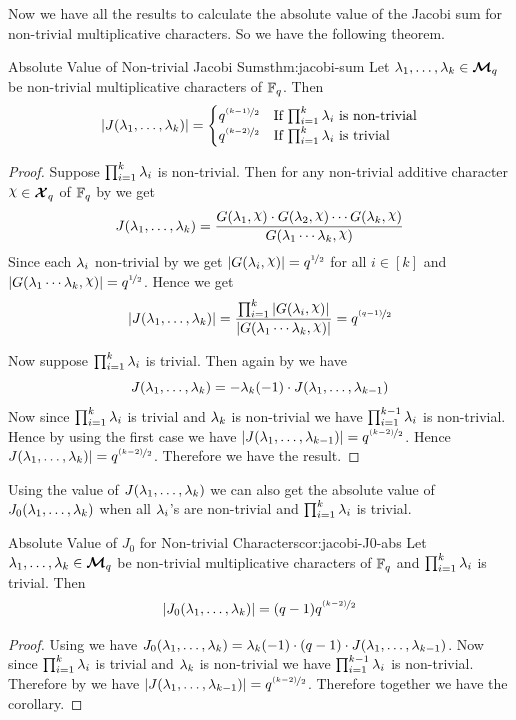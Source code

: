 Now we have all the results to calculate the absolute value of the Jacobi sum for non-trivial multiplicative characters. So we have the following theorem. 
\begin{Theorem}{Absolute Value of Non-trivial Jacobi Sums}{thm:jacobi-sum}
  Let $\lambda_1,\dots,\lambda_k\in\boldsymbol{\mathcal{M}}_q$ be non-trivial multiplicative characters of $\mathbb{F}_q$. Then $$|J(\lambda_1,\dots,\lambda_k)|=\begin{cases}
    q^{\nicefrac{(k-1)}{2}}& \text{If $\prod_{i=1}^k \lambda_i$ is non-trivial}\\ 
    q^{\nicefrac{(k-2)}{2}}& \text{If $\prod_{i=1}^k \lambda_i$ is trivial}
  \end{cases}$$
\end{Theorem}
\begin{proof}
  Suppose $\prod_{i=1}^k\lambda_i$ is non-trivial. Then for any non-trivial additive character $\chi\in\Xq$ of $\mathbb{F}_q$ by  we get $$J(\lm_1,\dots, \lm_k)=\frac{G(\lm_1,\chi)\cdot G(\lm_2,\chi)\cdots G(\lm_k,\chi)}{G(\lm_1\cdots \lm_k,\chi)}$$Since each $\lambda_i$ non-trivial by  we get $|G(\lm_i,\chi)|=q^{\nicefrac12}$ for all $i\in[k]$ and $|G(\lm_1\cdots\lm_k,\chi)|=q^{\nicefrac12}$. Hence we get $$|J(\lm_1,\dots,\lm_k)|=\frac{\prod_{i=1}^k|G(\lm_i,\chi)|}{|G(\lm_1\cdots\lm_k,\chi)|}=q^{\nicefrac{(q-1)}{2}}$$
  
  Now suppose $\prod_{i=1}^k\lambda_i$ is trivial. Then again by  we have $$J(\lambda_1,\dots, \lambda_k) = -\lambda_k(-1)\cdot J(\lambda_1,\dots, \lambda_{k-1})$$Now since $\prod_{i=1}^k\lambda_i$ is trivial and $\lambda_k$ is non-trivial we have $\prod_{i=1}^{k-1}\lambda_i$ is non-trivial. Hence by using the first case we have $|J(\lambda_1,\dots,\lambda_{k-1})|=q^{\nicefrac{(k-2)}{2}}$. Hence $J(\lambda_1,\dots, \lambda_k)|=q^{\nicefrac{(k-2)}{2}}$. Therefore we have the result. 
\end{proof}

Using the value of $J(\lambda_1,\dots,\lambda_k)$ we can also get the absolute value of $J_0(\lambda_1,\dots,\lambda_k)$ when all $\lambda_i$'s are non-trivial and $\prod_{i=1}^k\lambda_i$ is trivial. 
\begin{corolary}{Absolute Value of $J_0$ for Non-trivial Characters}{cor:jacobi-J0-abs}
  Let $\lambda_1,\dots,\lambda_k\in\boldsymbol{\mathcal{M}}_q$ be non-trivial multiplicative characters of $\mathbb{F}_q$ and $\prod_{i=1}^k\lambda_i$ is trivial. Then $$|J_0(\lambda_1,\dots,\lambda_k)|=(q-1)q^{\nicefrac{(k-2)}{2}}$$
\end{corolary}
\begin{proof}
  Using  we have $J_0(\lambda_1,\dots,\lambda_k)=\lambda_k(-1)\cdot (q-1)\cdot J(\lambda_1,\dots,\lambda_{k-1})$. Now since $\prod_{i=1}^k\lambda_i$ is trivial and $\lambda_k$ is non-trivial we have $\prod_{i=1}^{k-1}\lambda_i$ is non-trivial. Therefore by  we have $|J(\lambda_1,\dots,\lambda_{k-1})|=q^{\nicefrac{(k-2)}{2}}$. Therefore together we have the corollary. 
\end{proof}

